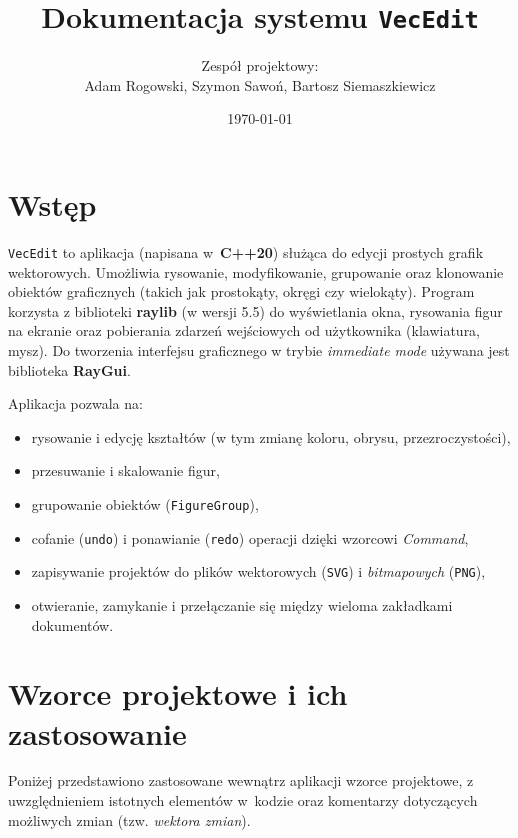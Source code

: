 \documentclass[a4paper,12pt]{article}
\title{\textbf{Dokumentacja systemu \texttt{VecEdit}}}
\author{Zespół projektowy: \\
\small Adam Rogowski, Szymon Sawoń, Bartosz Siemaszkiewicz}
\date{\today}
\begin{document}
\maketitle
\tableofcontents

\section{Wstęp}

\texttt{VecEdit} to aplikacja (napisana w~\textbf{C++20}) służąca do edycji prostych
grafik wektorowych. Umożliwia rysowanie, modyfikowanie, grupowanie oraz klonowanie
obiektów graficznych (takich jak prostokąty, okręgi czy wielokąty). 
Program korzysta z biblioteki \textbf{raylib} (w wersji 5.5) do wyświetlania okna, 
rysowania figur na ekranie oraz pobierania zdarzeń wejściowych od użytkownika 
(klawiatura, mysz). Do tworzenia interfejsu graficznego w trybie \emph{immediate mode}
używana jest biblioteka \textbf{RayGui}.  

Aplikacja pozwala na:
\begin{itemize}
    \item rysowanie i edycję kształtów (w tym zmianę koloru, obrysu, przezroczystości),
    \item przesuwanie i skalowanie figur,
    \item grupowanie obiektów (\texttt{FigureGroup}),
    \item cofanie (\texttt{undo}) i ponawianie (\texttt{redo}) operacji dzięki wzorcowi \emph{Command},
    \item zapisywanie projektów do plików wektorowych (\texttt{SVG}) i \emph{bitmapowych} (\texttt{PNG}),
    \item otwieranie, zamykanie i przełączanie się między wieloma zakładkami dokumentów.
\end{itemize}

\section{Wzorce projektowe i ich zastosowanie}

Poniżej przedstawiono zastosowane wewnątrz aplikacji wzorce projektowe,
z uwzględnieniem istotnych elementów w~kodzie oraz komentarzy dotyczących
możliwych zmian (tzw. \emph{wektora zmian}).
\end{document}
